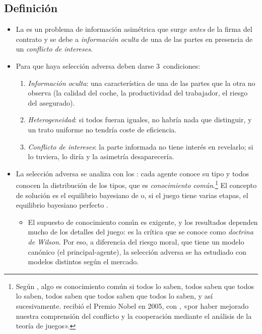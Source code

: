 \documentclass[11pt]{article}
\begin{document}
\subsection{Definición}\label{sec:definicion-sa}

\begin{itemize}
\item La  es un problema de información asimétrica que surge \emph{antes} de la firma del contrato y se debe a \emph{información oculta} de una de las partes en presencia de un \emph{conflicto de intereses}.
\item Para que haya selección adversa deben darse 3~condiciones:
  \begin{enumerate}
  \item \emph{Información oculta}: una característica de una de las partes que la otra no observa (la calidad del coche, la productividad del trabajador, el riesgo del asegurado).
  \item \emph{Heterogeneidad}: si todos fueran iguales, no habría nada que distinguir, y un trato uniforme no tendría coste de eficiencia.
  \item \emph{Conflicto de intereses}: la parte informada no tiene interés en revelarlo; si lo tuviera, lo diría y la asimetría desaparecería.
  \end{enumerate}
\item La selección adversa se analiza con los \nocite{Harsanyi1967Games}: cada agente conoce su tipo y todos conocen la distribución de los tipos, que es \emph{conocimiento común}.\footnote{Según \textcite{Aumann1976Agreeing}, algo es conocimiento común si todos lo saben, todos saben que todos lo saben, todos saben que todos saben que todos lo saben, y así sucesivamente.  recibió el Premio Nobel en 2005, con , «por haber mejorado nuestra comprensión del conflicto y la cooperación mediante el análisis de la teoría de juegos»\nocite{Nobel2005AumannSchelling}.} El concepto de solución es el equilibrio bayesiano de  o, si el juego tiene varias etapas, el equilibrio bayesiano perfecto .
  \begin{itemize}
  \item El supuesto de conocimiento común es exigente, y los resultados dependen mucho de los detalles del juego: es la crítica que se conoce como \emph{doctrina de Wilson}\nocite{Wilson1987Game}. Por eso, a diferencia del riesgo moral, que tiene un modelo canónico (el principal-agente), la selección adversa se ha estudiado con modelos distintos según el mercado.

\end{itemize}
\end{itemize}
\end{document}
